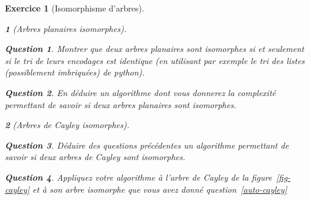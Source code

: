 \documentclass{article}
\theoremstyle{exostyle}
\newtheorem{exo}{Exercice}
\theoremstyle{partiestyle}
\newtheorem{partie}{}[exo]
\theoremstyle{questionstyle}
\newtheorem{questionpartie}{Question}[partie]
\begin{document}
\begin{exo}[Isomorphisme d'arbres]
\begin{partie}[Arbres planaires isomorphes]
	\begin{questionpartie}
		Montrer que deux arbres planaires sont isomorphes si et seulement si le tri de leurs encodages est identique (en utilisant par exemple le tri des listes (possiblement imbriquées) de python).
	\end{questionpartie}

	\begin{questionpartie}
		En déduire un algorithme dont vous donnerez la complexité permettant de savoir si deux arbres planaires sont isomorphes.
	\end{questionpartie}
	\end{partie}
	\begin{partie}[Arbres de Cayley isomorphes]
	\begin{questionpartie}
		Déduire des questions précédentes un algorithme permettant de savoir si deux arbres de Cayley sont isomorphes.
	\end{questionpartie}
	\begin{questionpartie}
		Appliquez votre algorithme à l'arbre de Cayley de la figure~\ref{fig-cayley} et à son arbre isomorphe que vous avez donné question~\ref{auto-cayley}
	\end{questionpartie}

	\end{partie}
	
\end{exo}

\clearpage
\end{document}
